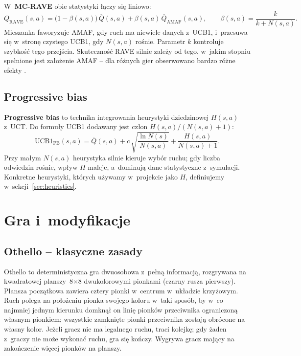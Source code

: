 \documentclass[11pt,a4paper]{article}
\begin{document}
W~\textbf{MC-RAVE} obie statystyki łączy się liniowo:
\[
Q_{\text{RAVE}}(s, a) = \big(1 - \beta(s,a)\big)\,\overline{Q}(s, a) + \beta(s,a)\,\overline{Q}_{\text{AMAF}}(s, a),
\qquad
\beta(s, a) = \frac{k}{k + N(s, a)}.
\]
Mieszanka faworyzuje AMAF, gdy ruch ma niewiele danych z~UCB1, i~przesuwa się w~stronę czystego UCB1, gdy $N(s,a)$ rośnie. Parametr $k$ kontroluje szybkość tego przejścia. Skuteczność RAVE silnie zależy od tego, w~jakim stopniu spełnione jest założenie AMAF -- dla różnych gier obserwowano bardzo różne efekty \cite{sironi2018comparison}.

\subsection{Progressive bias}\label{sec:pb}

\textbf{Progressive bias} \cite{chaslot2008progressive} to technika integrowania heurystyki dziedzinowej $H(s, a)$ z~UCT. Do formuły UCB1 dodawany jest człon $H(s,a) / (N(s,a) + 1)$:
\[
\mathrm{UCB1}_{\text{PB}}(s, a) = \overline{Q}(s, a) + c\,\sqrt{\frac{\ln N(s)}{N(s, a)}} + \frac{H(s, a)}{N(s, a) + 1}.
\]
Przy małym $N(s, a)$ heurystyka silnie kieruje wybór ruchu; gdy liczba odwiedzin rośnie, wpływ $H$ maleje, a~dominują dane statystyczne z~symulacji. Konkretne heurystyki, których używamy w~projekcie jako $H$, definiujemy w~sekcji~\ref{sec:heuristics}.

\section{Gra i~modyfikacje}\label{sec:gra}

\subsection{Othello -- klasyczne zasady}

Othello to deterministyczna gra dwuosobowa z~pełną informacją, rozgrywana na kwadratowej planszy~8$\times$8 dwukolorowymi pionkami (czarny rusza pierwszy). Plansza początkowa zawiera cztery pionki w~centrum w~układzie krzyżowym. Ruch polega na położeniu pionka swojego koloru w~taki sposób, by w~co najmniej jednym kierunku domknął on linię pionków przeciwnika ograniczoną własnym pionkiem; wszystkie zamknięte pionki przeciwnika zostają obrócone na własny kolor. Jeżeli gracz nie ma legalnego ruchu, traci kolejkę; gdy żaden z~graczy nie może wykonać ruchu, gra się kończy. Wygrywa gracz mający na zakończenie więcej pionków na planszy.
\end{document}
